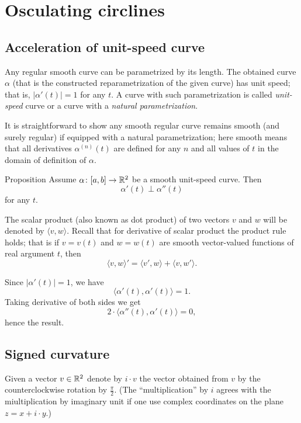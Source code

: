 \chapter{Osculating circlines}


\section{Acceleration of unit-speed curve}

Any regular smooth curve can be parametrized by its length.
The obtained curve $\alpha$ (that is the constructed reparametrization of the given curve) has unit speed; 
that is, $|\alpha'(t)|=1$ for any $t$.
A curve with such parametrization is called \emph{unit-speed} curve
or a curve with a \emph{natural parametrization}. 

It is straightforward to show any smooth regular curve remains smooth (and surely regular) if equipped with a natural parametrization; 
here smooth means that all derivatives $\alpha^{(n)}(t)$ are defined for any $n$ and all values of $t$ in the domain of definition of $\alpha$.

\begin{thm}{Proposition}\label{prop:a'-pertp-a''}
Assume $\alpha\colon[a,b]\to\mathbb{R}^2$ be a smooth unit-speed curve.
Then 
\[\alpha'(t)\perp \alpha''(t)\]
for any $t$.
\end{thm}

The scalar product (also known as dot product) of two vectors $v$ and $w$ will be denoted by $\langle v,w\rangle$.
Recall that for derivative of scalar product the product rule holds;
that is if $v=v(t)$ and $w=w(t)$ are smooth vector-valued functions of real argument $t$, then
\[\langle v,w\rangle'=\langle v',w\rangle+\langle v,w'\rangle.\]

Since $|\alpha'(t)|=1$, we have
\[\langle\alpha'(t),\alpha'(t)\rangle=1.\]
Taking derivative of both sides we get
\[2\cdot\langle\alpha''(t),\alpha'(t)\rangle=0,\]
hence the result.
\qeds

\section{Signed curvature}

Given a vector $v\in \mathbb{R}^2$ denote by $i\cdot v$ the vector obtained from $v$ by the counterclockwise rotation by $\tfrac\pi2$.
(The ``multiplication'' by $i$ agrees with the miultiplication by imaginary unit if one use  complex coordinates on the plane $z=x+i\cdot y$.)

